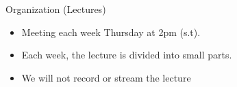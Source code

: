 \documentclass[aspectratio=169]{./latex_main/tntbeamer}  %
\begin{document}
\begin{frame}[c]{Organization (Lectures)}
	
	\begin{itemize}
		\item Meeting each week Thursday at 2pm (s.t).
		\pause
		\item Each week, the lecture is divided into small parts.
		\pause
		\item We will not record or stream the lecture
	\end{itemize}
	
\end{frame}
\end{document}
